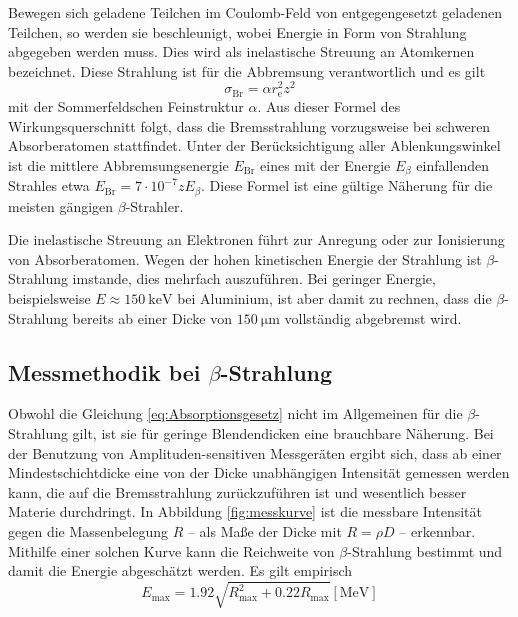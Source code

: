 Bewegen sich geladene Teilchen im Coulomb-Feld von entgegengesetzt geladenen Teilchen, so werden sie beschleunigt, 
wobei Energie in Form von Strahlung abgegeben werden muss.
Dies wird als inelastische Streuung an Atomkernen bezeichnet.
Diese Strahlung ist für die Abbremsung verantwortlich und es gilt
\begin{equation}
 	\sigma_\text{Br}=\alpha r_\text{e}^2 z^2
 \end{equation} 
mit der Sommerfeldschen Feinstruktur $\alpha$.
Aus dieser Formel des Wirkungsquerschnitt folgt, dass die Bremsstrahlung vorzugsweise bei schweren Absorberatomen stattfindet.
Unter der Berücksichtigung aller Ablenkungswinkel ist die mittlere Abbremsungsenergie $E_\text{Br}$ eines mit der Energie $E_\beta$ einfallenden Strahles etwa $E_\text{Br} = 7\cdot10^{-7}zE_\beta$.
Diese Formel ist eine gültige Näherung für die meisten gängigen $\beta$-Strahler.

Die inelastische Streuung an Elektronen führt zur Anregung oder zur Ionisierung von Absorberatomen.
Wegen der hohen kinetischen Energie der Strahlung ist $\beta$-Strahlung imstande, dies mehrfach auszuführen.
Bei geringer Energie, beispielsweise $E\approx\SI{150}{\kilo\electronvolt}$ bei Aluminium, ist aber damit zu rechnen, 
dass die $\beta$-Strahlung bereits ab einer Dicke von $\SI{150}{\micro\meter}$ vollständig abgebremst wird.

\subsection{Messmethodik bei \texorpdfstring{$\beta$}{Beta}-Strahlung}
Obwohl die Gleichung \eqref{eq:Absorptionsgesetz} nicht im Allgemeinen für die $\beta$-Strahlung gilt, ist sie für geringe Blendendicken eine brauchbare Näherung.
Bei der Benutzung von Amplituden-sensitiven Messgeräten ergibt sich, dass ab einer Mindestschichtdicke eine von der Dicke unabhängigen Intensität gemessen werden kann, die auf die Bremsstrahlung zurückzuführen ist und wesentlich besser Materie durchdringt.
In Abbildung \ref{fig:messkurve} ist die messbare Intensität gegen die Massenbelegung $R$ -- als Maße der Dicke mit $R=\rho D$ -- erkennbar.
Mithilfe einer solchen Kurve kann die Reichweite von $\beta$-Strahlung bestimmt und damit die Energie abgeschätzt werden.
Es gilt empirisch
\begin{equation}
	E_\text{max}=1.92\sqrt{R_\text{max}^2+0.22R_\text{max}} [ \si{\mega\electronvolt}]
\end{equation}
